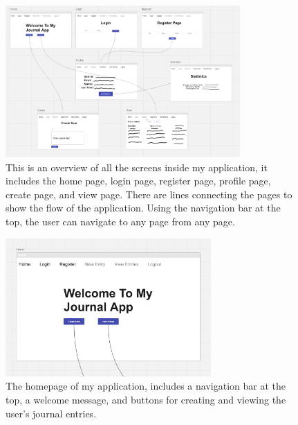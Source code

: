 \newpage
\begin{figure}[H]
    \centering
    \includegraphics[width=0.8\textwidth]{Assets/all_pages.png}
    \caption{This is an overview of all the screens inside my application, it includes the home page, login page, register page, profile page, create page, and view page. There are lines connecting the pages to show the flow of the application. Using the navigation bar at the top, the user can navigate to any page from any page.}
\end{figure}


\begin{figure}[H]
    \centering
    \includegraphics[width=0.7\textwidth]{Assets/home_page.png}
    \caption{The homepage of my application, includes a navigation bar at the top, a welcome message, and buttons for creating and viewing the user's journal entries.}
\end{figure}

